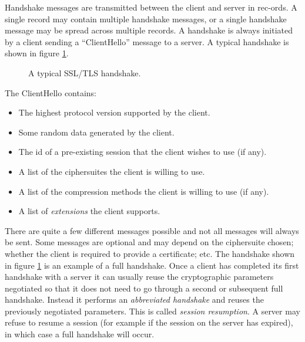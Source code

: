 Handshake messages are transmitted between the client and server in rec-ords. A 
single record may contain multiple handshake messages, or a single handshake 
message may be spread across multiple records. A handshake is always initiated 
by a client sending a ``ClientHello'' message to a server. A typical handshake 
is shown in figure \ref{fig:typical-hand}.

\begin{figure}[t]
\caption{A typical SSL/TLS handshake.}
\label{fig:typical-hand}
\end{figure}

The ClientHello contains:
\begin{itemize}
\item The highest protocol version supported by the client.
\item Some random data generated by the client.
\item The id of a pre-existing session that the client wishes to use (if any).
\item A list of the ciphersuites the client is willing to use.
\item A list of the compression methods the client is willing to use (if any).
\item A list of \emph{extensions} the client supports.
\end{itemize}

There are quite a few different messages possible and not all messages will 
always be sent. Some messages are optional and may depend on the ciphersuite 
chosen; whether the client is required to provide a certificate; etc. The 
handshake shown in figure \ref{fig:typical-hand} is an example of a full 
handshake. Once a client has completed its first handshake with a server it can 
usually reuse the cryptographic parameters negotiated so that it does not need 
to go through a second or subsequent full handshake. Instead it performs an 
\emph{abbreviated handshake} and reuses the previously negotiated parameters. 
This is called \emph{session resumption}. A server may refuse to resume a 
session (for example if the session on the server has expired), in which case a 
full handshake will occur.
